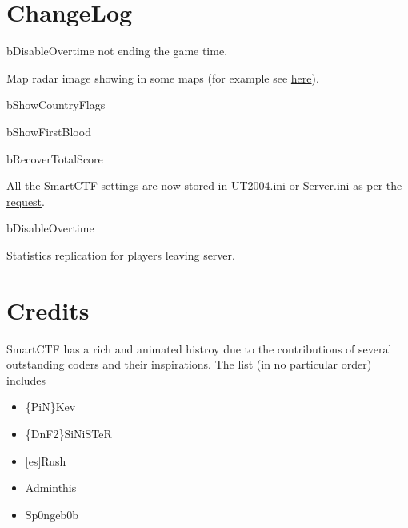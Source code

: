 \documentclass{article}
\begin{document}
\section{ChangeLog}
\begin{changelog}[author=The\_Cowboy,
                  sectioncmd=\subsection,
                  title=SmartCTF changelog]
\begin{version}[v=1C(Unreleased)]
\fixed
     \item bDisableOvertime not ending the game time.
     \item Map radar image showing in some maps (for example see \href{https://github.com/ravimohan1991/SmartCTF/issues/4}{\color{blue}here}).
\added
     \item bShowCountryFlags
     \item bShowFirstBlood
     \item bRecoverTotalScore
\deprecated
     \item All the SmartCTF settings are now stored in {\color{Purple}UT2004.ini} or {\color{Purple}Server.ini} as per the \href{https://github.com/ravimohan1991/SmartCTF/issues/3}{{\color{Blue}request}}. 
\end{version}
\begin{version}[v=1B, date=2020-06-10]
\added
     \item bDisableOvertime
\fixed
     \item Statistics replication for players leaving server.
\end{version}
\end{changelog}


\section{Credits}
SmartCTF has a rich and animated histroy due to the contributions of several outstanding coders and their inspirations.  The list (in no particular order) includes
\begin{itemize}
\item \{PiN\}Kev
\item \{DnF2\}SiNiSTeR
\item {[es]}Rush
\item Adminthis
\item Sp0ngeb0b 
\end{itemize}
\end{document}
